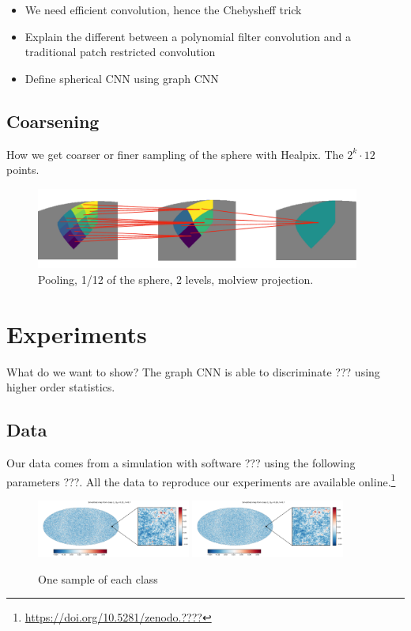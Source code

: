 \documentclass[preprint,12pt,authoryear]{elsarticle}
\newcommand{\todo}[1]{{\color[rgb]{.6,.1,.6}{#1}}}
\newcommand{\assign}[1]{{\color[rgb]{.8,.5,.8}{Assigned: #1 }}}
\begin{document}
\begin{itemize}
	\item We need efficient convolution, hence the Chebysheff trick
	\item Explain the different between a polynomial filter convolution and a traditional patch restricted convolution
	\item Define spherical CNN using graph CNN
\end{itemize}


\subsection{Coarsening}
\assign{Nathanaël}

How we get coarser or finer sampling of the sphere with Healpix. The $2^k \cdot 12$ points.

\begin{figure}[!ht]
\centering
\includegraphics[width=0.95\textwidth]{figures/pooling.pdf}
\caption{Pooling, 1/12 of the sphere, 2 levels, molview projection.}
\label{fig:pooling}
\end{figure}


\section{Experiments}

What do we want to show? The graph CNN is able to discriminate ??? using higher order statistics.

\subsection{Data}
\assign{Tomek}

Our data comes from a simulation with software ??? using the following parameters ???. All the data to reproduce our experiments are available online.\footnote{\url{https://doi.org/10.5281/zenodo.????} \todo{correct DOI}}

\begin{figure}[!ht]
\centering
\includegraphics[width=0.45\textwidth]{figures/smooth_map_class_1.pdf}
\includegraphics[width=0.45\textwidth]{figures/smooth_map_class_2.pdf}
\caption{One sample of each class }
\label{fig:map_sample}
\end{figure}
\end{document}
